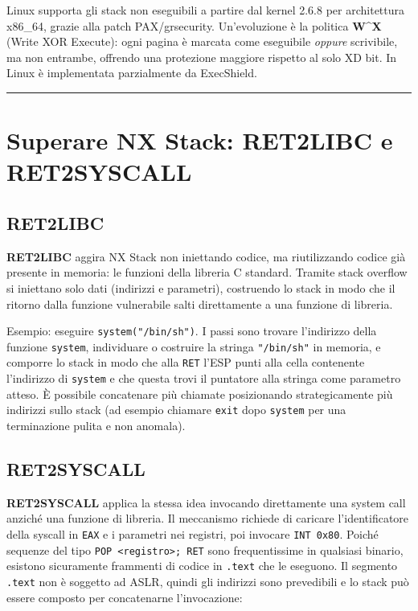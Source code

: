 \documentclass[12pt, a4paper]{report}
\begin{document}
Linux supporta gli stack non eseguibili a partire dal kernel 2.6.8 per architettura x86\_64, grazie alla patch PAX/grsecurity. Un'evoluzione è la politica \textbf{W\^{}X} (Write XOR Execute): ogni pagina è marcata come eseguibile \textit{oppure} scrivibile, ma non entrambe, offrendo una protezione maggiore rispetto al solo XD bit. In Linux è implementata parzialmente da ExecShield.

\noindent\rule{\textwidth}{0.4pt}

\section{Superare NX Stack: RET2LIBC e RET2SYSCALL}

\subsection{RET2LIBC}
\textbf{RET2LIBC} aggira NX Stack non iniettando codice, ma riutilizzando codice già presente in memoria: le funzioni della libreria C standard. Tramite stack overflow si iniettano solo dati (indirizzi e parametri), costruendo lo stack in modo che il ritorno dalla funzione vulnerabile salti direttamente a una funzione di libreria.

Esempio: eseguire \texttt{system("/bin/sh")}. I passi sono trovare l'indirizzo della funzione \texttt{system}, individuare o costruire la stringa \texttt{"/bin/sh"} in memoria, e comporre lo stack in modo che alla \texttt{RET} l'ESP punti alla cella contenente l'indirizzo di \texttt{system} e che questa trovi il puntatore alla stringa come parametro atteso. È possibile concatenare più chiamate posizionando strategicamente più indirizzi sullo stack (ad esempio chiamare \texttt{exit} dopo \texttt{system} per una terminazione pulita e non anomala).

\subsection{RET2SYSCALL}
\textbf{RET2SYSCALL} applica la stessa idea invocando direttamente una system call anziché una funzione di libreria. Il meccanismo richiede di caricare l'identificatore della syscall in \texttt{EAX} e i parametri nei registri, poi invocare \texttt{INT 0x80}. Poiché sequenze del tipo \texttt{POP <registro>; RET} sono frequentissime in qualsiasi binario, esistono sicuramente frammenti di codice in \texttt{.text} che le eseguono. Il segmento \texttt{.text} non è soggetto ad ASLR, quindi gli indirizzi sono prevedibili e lo stack può essere composto per concatenarne l'invocazione:
\end{document}
